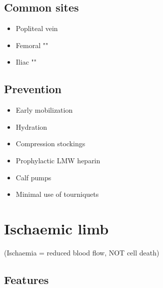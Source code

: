 \documentclass[
  12pt,
]{memoir}
\providecommand{\tightlist}{%
  \setlength{\itemsep}{0pt}\setlength{\parskip}{0pt}}
\begin{document}
\hypertarget{common-sites}{%
\subsection{Common sites}\label{common-sites}}

\begin{itemize}
\tightlist
\item
  Popliteal vein
\item
  Femoral ""
\item
  Iliac ""
\end{itemize}

\hypertarget{prevention}{%
\subsection{Prevention}\label{prevention}}

\begin{itemize}
\tightlist
\item
  Early mobilization
\item
  Hydration
\item
  Compression stockings
\item
  Prophylactic LMW heparin
\item
  Calf pumps
\item
  Minimal use of tourniquets
\end{itemize}

\hypertarget{ischaemic-limb}{%
\section{Ischaemic limb}\label{ischaemic-limb}}

(Ischaemia = reduced blood flow, NOT cell death)

\hypertarget{features-3}{%
\subsection{Features}\label{features-3}}
\end{document}
